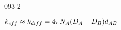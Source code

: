 \begin{mitframe}{093-2}
 \begin{listone}
	\item $\thermcond_{eff}\approx\thermcond _{diff}=4\pi\nummoles_{\helmholtz}(\elecdisplace_{\helmholtz}+\elecdisplace_{\exergy})d_{\helmholtz\exergy}$
\end{listone}   
\end{mitframe}